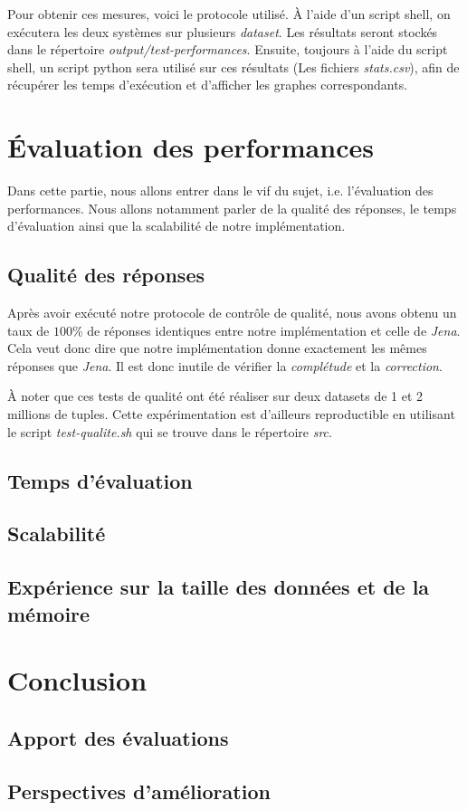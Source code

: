\documentclass[12pt,titlepage]{article}
\begin{document}
Pour obtenir ces mesures, voici le protocole utilisé. À l'aide d'un script shell, on exécutera les deux systèmes sur plusieurs \textit{dataset}. Les résultats seront stockés dans le répertoire \textit{output/test-performances}. Ensuite, toujours à l'aide du script shell, un script python sera utilisé sur ces résultats (Les fichiers \textit{stats.csv}), afin de récupérer les temps d'exécution et d'afficher les graphes correspondants.

\section{Évaluation des performances}

Dans cette partie, nous allons entrer dans le vif du sujet, i.e. l'évaluation des performances. Nous allons notamment parler de la qualité des réponses, le temps d'évaluation ainsi que la scalabilité de notre implémentation.

\subsection{Qualité des réponses}

Après avoir exécuté notre protocole de contrôle de qualité, nous avons obtenu un taux de $100\%$ de réponses identiques entre notre implémentation et celle de \textit{Jena}. Cela veut donc dire que notre implémentation donne exactement les mêmes réponses que \textit{Jena}. Il est donc inutile de vérifier la \textit{complétude} et la \textit{correction}.

À noter que ces tests de qualité ont été réaliser sur deux datasets de 1 et 2 millions de tuples. Cette expérimentation est d'ailleurs reproductible en utilisant le script \textit{test-qualite.sh} qui se trouve dans le répertoire \textit{src}.

\subsection{Temps d'évaluation}

\subsection{Scalabilité}

\subsection{Expérience sur la taille des données et de la mémoire}

\section{Conclusion}

\subsection{Apport des évaluations}

\subsection{Perspectives d'amélioration}
\end{document}
